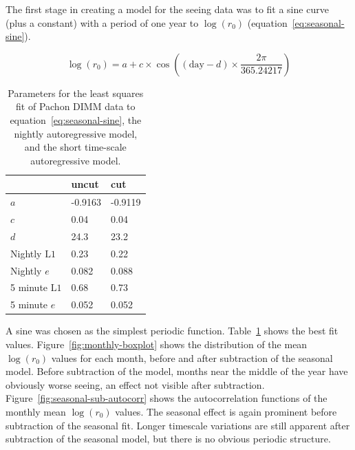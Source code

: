 \documentclass[DM,authoryear,toc]{lsstdoc}
\begin{document}
The first stage in creating a model for the seeing data was to fit a
sine curve (plus a constant) with a period of one year to
$\log(r_0)$ (equation~\ref{eq:seasonal-sine}).

\begin{equation} \label{eq:seasonal-sine}
\log(r_0) = a + c \times \cos\left( (\mbox{day} - d) \times \frac{2\pi}{365.24217} \right)
\end{equation}

\begin{table}
\begin{center}
  \begin{tabular}{ l l l } \hline
      & uncut & cut \\ \hline
  $a$ & -0.9163 & -0.9119\\
  $c$ & 0.04 & 0.04 \\
  $d$ & 24.3 &  23.2 \\ \hline
  Nightly $\mbox{L1}$ & 0.23 & 0.22 \\
  Nightly $e$ & 0.082 & 0.088\\ \hline
  5 minute $\mbox{L1}$ & 0.68 & 0.73\\
  5 minute $e$ & 0.052 & 0.052\\ \hline
\end{tabular}
\caption{Parameters for the least squares fit of Pachon DIMM data to
  equation~\ref{eq:seasonal-sine}, the nightly autoregressive model,
  and the short time-scale autoregressive model.}\label{tab:fit-params}
\end{center}
\end{table}

A sine was chosen as the simplest periodic
function. Table~\ref{tab:fit-params} shows the best fit
values. Figure~\ref{fig:monthly-boxplot} shows the distribution of the
mean $\log(r_0)$ values for each month, before and after subtraction
of the seasonal model. Before subtraction of the model, months near
the middle of the year have obviously worse seeing, an effect not
visible after subtraction. Figure~\ref{fig:seasonal-sub-autocorr}
shows the autocorrelation functions of the monthly mean $\log(r_0)$
values. The seasonal effect is again prominent before subtraction of
the seasonal fit. Longer timescale variations are still apparent after
subtraction of the seasonal model, but there is no obvious periodic
structure.
\end{document}

